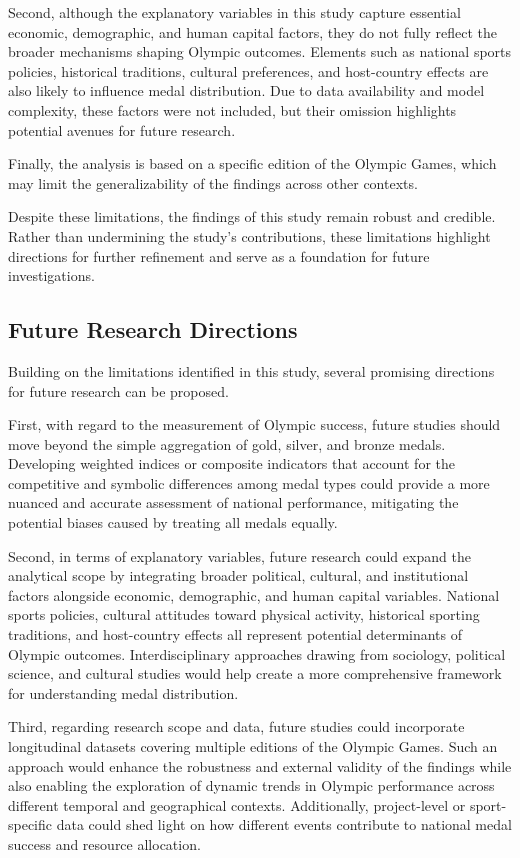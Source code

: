 \documentclass[11pt,twoside]{article}
\numberwithin{Theorem}{section}
\numberwithin{Definition}{section}
\numberwithin{Lemma}{section}
\numberwithin{Algorithm}{section}
\numberwithin{equation}{section}
\begin{document}
Second, although the explanatory variables in this study capture essential economic, demographic, and human capital factors, they do not fully reflect the broader mechanisms shaping Olympic outcomes. Elements such as national sports policies, historical traditions, cultural preferences, and host-country effects are also likely to influence medal distribution. Due to data availability and model complexity, these factors were not included, but their omission highlights potential avenues for future research.  

Finally, the analysis is based on a specific edition of the Olympic Games, which may limit the generalizability of the findings across other contexts.  

Despite these limitations, the findings of this study remain robust and credible. Rather than undermining the study’s contributions, these limitations highlight directions for further refinement and serve as a foundation for future investigations.  

\subsection{Future Research Directions}
Building on the limitations identified in this study, several promising directions for future research can be proposed.  

First, with regard to the measurement of Olympic success, future studies should move beyond the simple aggregation of gold, silver, and bronze medals. Developing weighted indices or composite indicators that account for the competitive and symbolic differences among medal types could provide a more nuanced and accurate assessment of national performance, mitigating the potential biases caused by treating all medals equally.  

Second, in terms of explanatory variables, future research could expand the analytical scope by integrating broader political, cultural, and institutional factors alongside economic, demographic, and human capital variables. National sports policies, cultural attitudes toward physical activity, historical sporting traditions, and host-country effects all represent potential determinants of Olympic outcomes. Interdisciplinary approaches drawing from sociology, political science, and cultural studies would help create a more comprehensive framework for understanding medal distribution.  

Third, regarding research scope and data, future studies could incorporate longitudinal datasets covering multiple editions of the Olympic Games. Such an approach would enhance the robustness and external validity of the findings while also enabling the exploration of dynamic trends in Olympic performance across different temporal and geographical contexts. Additionally, project-level or sport-specific data could shed light on how different events contribute to national medal success and resource allocation.  
\end{document}
